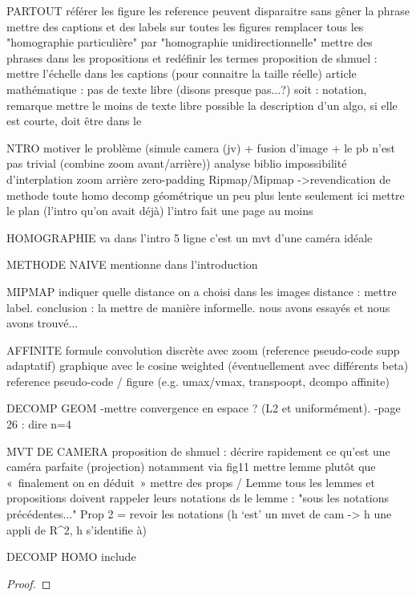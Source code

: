 PARTOUT
	référer les figure
	les reference peuvent disparaitre sans gêner la phrase
	mettre des captions et des labels sur toutes les figures
	remplacer tous les "homographie particulière" par "homographie unidirectionnelle"
	mettre des phrases dans les propositions et redéfinir les termes
	proposition de shmuel : mettre l'échelle dans les captions (pour connaitre la taille réelle)
	article mathématique : pas de texte libre (disons presque pas...?)
		soit : notation, remarque
	mettre le moins de texte libre possible
	la description d'un algo, si elle est courte, doit être dans le \caption



INTRO
motiver le problème (simule camera (jv) + fusion d’image + le pb n’est pas trivial (combine zoom avant/arrière))
analyse biblio
	impossibilité d’interplation 
	zoom arrière zero-padding
	Ripmap/Mipmap
->revendication de methode
	toute homo
	decomp géométrique
	un peu plus lente
seulement ici mettre le plan (l'intro qu'on avait déjà)
l'intro fait une page au moins





HOMOGRAPHIE
	va dans l’intro 5 ligne
	c’est un mvt d’une caméra idéale

METHODE NAIVE
	mentionne dans l’introduction 

MIPMAP
	indiquer quelle distance on a choisi
	dans les images distance : mettre label.
	conclusion : la mettre de manière informelle.
	nous avons essayés et nous avons trouvé...

AFFINITE
	formule convolution discrète avec zoom (reference pseudo-code supp adaptatif)
	graphique avec le cosine weighted (éventuellement avec différents beta)
	reference pseudo-code / figure (e.g. umax/vmax, transpoopt, dcompo affinite)


DECOMP GEOM 
	-mettre convergence en espace ? (L2 et uniformément).
	-page 26 : dire n=4


MVT DE CAMERA
	proposition de shmuel : décrire rapidement ce qu'est une caméra parfaite (projection) notamment via fig11
	mettre lemme plutôt que « finalement on en déduit »
	mettre des props / Lemme
		tous les lemmes et propositions doivent rappeler leurs notations
		ds le lemme : "sous les notations précédentes..."
	Prop 2 = revoir les notations (h ‘est’ un mvet de cam -> h une appli de R^2, h s'identifie à)

DECOMP HOMO
	include \begin{proof} \end{proof}

